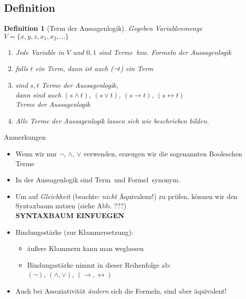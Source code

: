 \subsection{Definition}
\newtheorem{defi}{Definition}
\begin{defi}[Term der Aussagenlogik]
Gegeben Variablenmenge $V = \{ x,y,z,x_1,x_2, ...\} $
\begin{enumerate}
\item Jede Variable in $V$ und $0,1$ sind \glq Terme\grq\ bzw. Formeln der Aussagenlogik
\item falls $t$ ein Term, dann ist auch ($\neg t$) ein Term
\item sind $s,t$ Terme der Aussagenlogik, \\
dann sind auch $(s \land t)$, $(s \lor t)$, $(s\rightarrow t)$, $(s\leftrightarrow t)$ \\
Terme der Aussagenlogik
\item Alle Terme der Aussagenlogik lassen sich wie beschrieben bilden.
\end{enumerate}
\end{defi}
%
Anmerkungen
\begin{itemize}
\item Wenn wir nur $\neg$, $\land$, $\lor$ verwenden, erzeugen wir die sogenannten \glq Booleschen Terme\grq
\item In der Aussagenlogik sind \glq Term\grq\ und \glq Formel\grq\ synonym.
\item Um auf \emph{Gleichheit} (beachte: \emph{nicht} Äquivalenz!) zu prüfen, können wir den Syntaxbaum nutzen (siehe Abb. ???)
\\ \textbf{SYNTAXBAUM EINFUEGEN}
\item Bindungsstärke (zur Klammersetzung):
\begin{itemize}
\item äußere Klammern kann man weglassen
\item Bindungsstärke nimmt in dieser Reihenfolge ab: \\
$(\neg)$, $(\land,\lor)$, $(\rightarrow, \leftrightarrow)$
\end{itemize}
\item Auch bei Assoziativität \emph{ändern} sich die Formeln, sind aber äquivalent!
\end{itemize}
